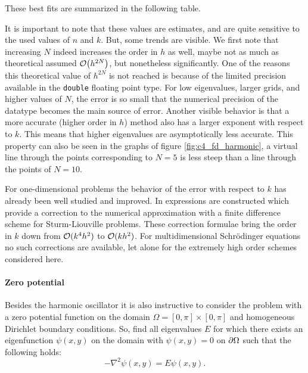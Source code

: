 These best fits are summarized in the following table.
\begin{center}
    
\end{center}

It is important to note that these values are estimates, and are quite sensitive to the used values of $n$ and $k$. But, some trends are visible. We first note that increasing $N$ indeed increases the order in $h$ as well, maybe not as much as theoretical assumed $\OO\mleft(h^{2N}\mright)$, but nonetheless significantly. One of the reasons this theoretical value of $h^{2N}$ is not reached is because of the limited precision available in the \texttt{double} floating point type. For low eigenvalues, larger grids, and higher values of $N$, the error is so small that the numerical precision of the datatype becomes the main source of error. Another visible behavior is that a more accurate (higher order in $h$) method also has a larger exponent with respect to $k$. This means that higher eigenvalues are asymptotically less accurate. This property can also be seen in the graphs of figure \ref{fig:c4_fd_harmonic}, a virtual line through the points corresponding to $N = 5$ is less steep than a line through the points of $N = 10$.

For one-dimensional problems the behavior of the error with respect to $k$ has already been well studied and improved. In \cite{paine_correction_1981} expressions are constructed which provide a correction to the numerical approximation with a finite difference scheme for Sturm-Liouville problems. These correction formulae bring the order in $k$ down from $\operatorname{\mathcal{O}}(k^4h^2)$ to $\operatorname{\mathcal{O}}(k h^2)$. For multidimensional Schrödinger equations no such corrections are available, let alone for the extremely high order schemes considered here.

\paragraph{Zero potential} Besides the harmonic oscillator it is also instructive to consider the problem with a zero potential function on the domain $\Omega = [0, \pi] \times [0, \pi]$ and homogeneous Dirichlet boundary conditions. So, find all eigenvalues $E$ for which there exists an eigenfunction $\psi(x, y)$ on the domain with $\psi(x, y) = 0$ on $\partial\Omega$ such that the following holds:
\begin{equation}\label{equ:c4_fd_zero}
    -\nabla^2 \psi(x, y) = E \psi(x, y) \text{.}
\end{equation}

